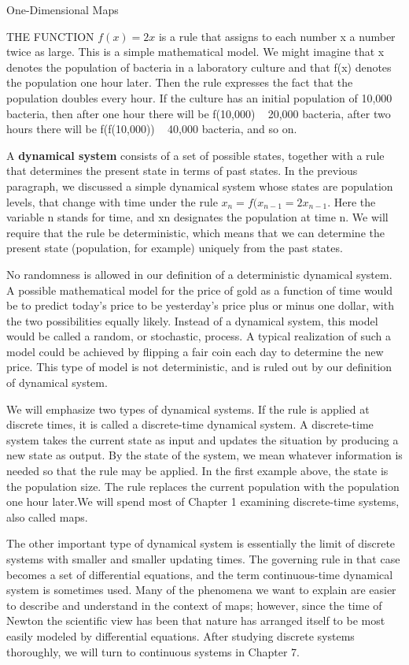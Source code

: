 \documentclass{article}
\begin{document}
One-Dimensional Maps

\hfill

THE FUNCTION $f(x)=2x$ is a rule that assigns to each number x a number
twice as large. This is a simple mathematical model. We might imagine that x
denotes the population of bacteria in a laboratory culture and that f(x) denotes
the population one hour later. Then the rule expresses the fact that the population
doubles every hour. If the culture has an initial population of 10,000 bacteria,
then after one hour there will be f(10,000)   20,000 bacteria, after two hours
there will be f(f(10,000))   40,000 bacteria, and so on.

A \textbf{dynamical system} consists of a set of possible states, together with a
rule that determines the present state in terms of past states. In the previous
paragraph, we discussed a simple dynamical system whose states are population
levels, that change with time under the rule $x_n = f(x_{n-1} = 2x_{n-1}$. Here the
variable n stands for time, and xn designates the population at time n. We will
require that the rule be deterministic, which means that we can determine the
present state (population, for example) uniquely from the past states.

No randomness is allowed in our definition of a deterministic dynamical
system. A possible mathematical model for the price of gold as a function of time
would be to predict today’s price to be yesterday’s price plus or minus one dollar,
with the two possibilities equally likely. Instead of a dynamical system, this model
would be called a random, or stochastic, process. A typical realization of such a
model could be achieved by flipping a fair coin each day to determine the new
price. This type of model is not deterministic, and is ruled out by our definition
of dynamical system.

We will emphasize two types of dynamical systems. If the rule is applied
at discrete times, it is called a discrete-time dynamical system. A discrete-time
system takes the current state as input and updates the situation by producing a
new state as output. By the state of the system, we mean whatever information
is needed so that the rule may be applied. In the first example above, the state is
the population size. The rule replaces the current population with the population
one hour later.We will spend most of Chapter 1 examining discrete-time systems,
also called maps.

The other important type of dynamical system is essentially the limit of
discrete systems with smaller and smaller updating times. The governing rule in
that case becomes a set of differential equations, and the term continuous-time
dynamical system is sometimes used. Many of the phenomena we want to explain
are easier to describe and understand in the context of maps; however, since the
time of Newton the scientific view has been that nature has arranged itself to
be most easily modeled by differential equations. After studying discrete systems
thoroughly, we will turn to continuous systems in Chapter 7.
\end{document}
